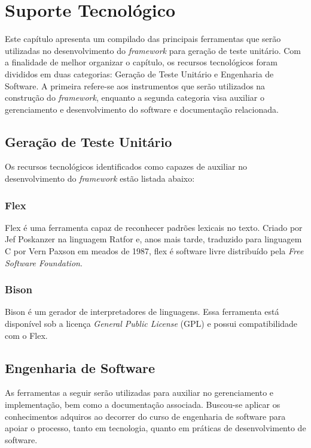 \chapter[Suporte Tecnológico]{Suporte Tecnológico}

Este capítulo apresenta um compilado das principais ferramentas que serão utilizadas no desenvolvimento do \textit{framework} para geração de teste unitário. Com a finalidade de melhor organizar o capítulo, os recursos tecnológicos foram divididos em duas categorias: Geração de Teste Unitário e Engenharia de Software. A primeira refere-se aos instrumentos que serão utilizados na construção do \textit{framework}, enquanto a segunda categoria visa auxiliar o gerenciamento e desenvolvimento do software e documentação relacionada.

\section{Geração de Teste Unitário}

Os recursos tecnológicos identificados como capazes de auxiliar no desenvolvimento do \textit{framework} estão listada abaixo:

\subsection{Flex}
Flex é uma ferramenta capaz de reconhecer padrões lexicais no texto. Criado por Jef Poskanzer na linguagem Ratfor e, anos mais tarde, traduzido para linguagem C por Vern Paxson em meados de 1987, flex é software livre distribuído pela \textit{Free Software Foundation}. 

\subsection{Bison}
Bison é um gerador de interpretadores de linguagens. Essa ferramenta está disponível sob a licença \textit{General Public License} (GPL) e possui compatibilidade com o Flex. 

\section{Engenharia de Software}

As ferramentas a seguir serão utilizadas para auxiliar no gerenciamento e implementação, bem como a documentação associada. Buscou-se aplicar os conhecimentos adquiros ao decorrer do curso de engenharia de software para apoiar o processo, tanto em tecnologia, quanto em práticas de desenvolvimento de software.

